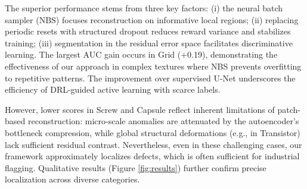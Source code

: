 \documentclass[twoside]{article}
\begin{document}
The superior performance stems from three key factors: (i) the neural batch sampler (NBS) focuses reconstruction on informative local regions; (ii) replacing periodic resets with structured dropout reduces reward variance and stabilizes training; (iii) segmentation in the residual error space facilitates discriminative learning. The largest AUC gain occurs in Grid (+0.19), demonstrating the effectiveness of our approach in complex textures where NBS prevents overfitting to repetitive patterns. The improvement over supervised U-Net underscores the efficiency of DRL-guided active learning with scarce labels.

However, lower scores in Screw and Capsule reflect inherent limitations of patch-based reconstruction: micro-scale anomalies are attenuated by the autoencoder's bottleneck compression, while global structural deformations (e.g., in Transistor) lack sufficient residual contrast. Nevertheless, even in these challenging cases, our framework approximately localizes defects, which is often sufficient for industrial flagging. Qualitative results (Figure \ref{fig:results}) further confirm precise localization across diverse categories.
\end{document}
